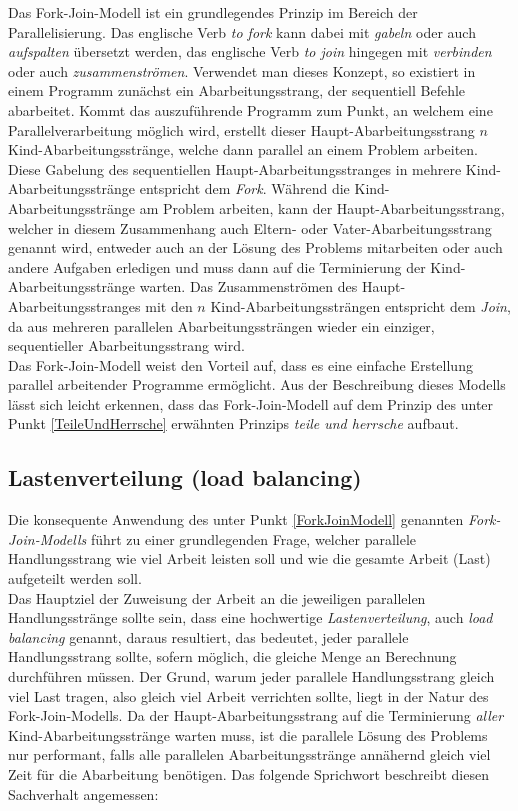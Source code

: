 			Das Fork-Join-Modell ist ein grundlegendes Prinzip im Bereich der Parallelisierung.
			Das englische Verb \textit{to fork} kann dabei mit \textit{gabeln} oder auch \textit{aufspalten} übersetzt werden, das englische Verb \textit{to join} hingegen mit \textit{verbinden} oder auch \textit{zusammenströmen}. Verwendet man dieses Konzept, so existiert in einem Programm zunächst ein Abarbeitungsstrang, der sequentiell Befehle abarbeitet. Kommt das auszuführende Programm zum Punkt, an welchem eine Parallelverarbeitung möglich wird, erstellt dieser Haupt-Abarbeitungsstrang $n$ Kind-Abarbeitungsstränge, welche dann parallel an einem Problem arbeiten. Diese Gabelung des sequentiellen Haupt-Abarbeitungsstranges in mehrere Kind-Abarbeitungsstränge entspricht dem \textit{Fork}. Während die Kind-Abarbeitungsstränge am Problem arbeiten, kann der Haupt-Abarbeitungsstrang, welcher in diesem Zusammenhang auch Eltern- oder Vater-Abarbeitungsstrang genannt wird, entweder auch an der Lösung des Problems mitarbeiten oder auch andere Aufgaben erledigen und muss dann auf die Terminierung der Kind-Abarbeitungsstränge warten. Das Zusammenströmen des Haupt-Abarbeitungsstranges mit den $n$ Kind-Abarbeitungssträngen entspricht dem \textit{Join}, da aus mehreren parallelen Abarbeitungssträngen wieder ein einziger, sequentieller Abarbeitungsstrang wird.\\
			Das Fork-Join-Modell weist den Vorteil auf, dass es eine einfache Erstellung parallel arbeitender Programme ermöglicht\cite{ParaProgRauber}. Aus der Beschreibung dieses Modells lässt sich leicht erkennen, dass das Fork-Join-Modell auf dem Prinzip des unter Punkt \ref{TeileUndHerrsche} erwähnten Prinzips \textit{teile und herrsche} aufbaut.

		\subsection{Lastenverteilung (load balancing)}
		
			Die konsequente Anwendung des unter Punkt \ref{ForkJoinModell} genannten \textit{Fork-Join-Modells} führt zu einer grundlegenden Frage, welcher parallele Handlungsstrang wie viel Arbeit leisten soll und wie die gesamte Arbeit (Last) aufgeteilt werden soll.\\
			Das Hauptziel der Zuweisung der Arbeit an die jeweiligen parallelen Handlungsstränge sollte sein, dass eine hochwertige \textit{Lastenverteilung}, auch \textit{load balancing} genannt, daraus resultiert, das bedeutet, jeder parallele Handlungsstrang sollte, sofern möglich, die gleiche Menge an Berechnung durchführen müssen. \cite{ParaProgRauber}
			Der Grund, warum jeder parallele Handlungsstrang gleich viel Last tragen, also gleich viel Arbeit verrichten sollte, liegt in der Natur des Fork-Join-Modells. Da der Haupt-Abarbeitungsstrang auf die Terminierung \textit{aller} Kind-Abarbeitungsstränge warten muss, ist die parallele Lösung des Problems nur performant, falls alle parallelen Abarbeitungsstränge annähernd gleich viel Zeit für die Abarbeitung benötigen. Das folgende Sprichwort beschreibt diesen Sachverhalt angemessen:
			
